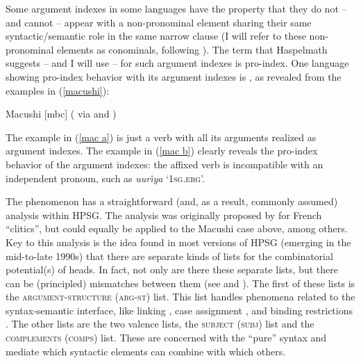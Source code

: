 \documentclass[output=paper
	        ,collection
	        ,collectionchapter
 	        ,biblatex
                ,babelshorthands
                ,newtxmath
                ,draftmode
                ,colorlinks, citecolor=brown
]{langscibook}
\begin{document}
Some argument indexes in some languages have the property that they do not -- and cannot -- appear with a non-pronominal element sharing their same syntactic/semantic role in the same narrow clause (I will refer to these non-pronominal elements as conominals, following \citealt{haspelmath13}). The term that Haspelmath suggests -- and I will use -- for such argument indexes is pro-index. One language showing pro-index behavior with its argument indexes is , as revealed from the examples in (\ref{macushi}): 
%
\begin{samepage}
\begin{exe}
\ex \label{macushi} Macushi [mbc] (\citealt{abbott91} via \citealt{siewierska99} and \citealt{corbett03}) \nolistbreak
\begin{xlist}
\end{xlist}
\end{exe}
\end{samepage}
The example in (\ref{mac a}) is just a verb with all its arguments realized as argument indexes. The example in (\ref{mac b}) clearly reveals the pro-index behavior of the argument indexes: the affixed verb is incompatible with an independent pronoun, such as \textit{uur\^{\i}ya} `\textsc{1sg.erg}'. 

The  phenomenon has a straightforward (and, as a result, commonly assumed) analysis within HPSG. The analysis was originally proposed by \citet{MS97a-u} for French ``clitics'', but could equally be applied to the Macushi case above, among others. Key to this analysis is the idea found in most versions of HPSG (emerging in the mid-to-late 1990s) that there are separate kinds of lists for the combinatorial potential(s) of heads. In fact, not only are there these separate lists, but there can be (principled) mismatches between them (see  and ). The first of these lists is the \textsc{argument-structure} (\textsc{arg-st}) list. This list handles phenomena related to the syntax-semantic interface, like linking \citep{Davis2001a-u}, case assignment \citep{Prze99b}, and binding restrictions \citep{mannsag98,wecharka98}. The other lists are the two valence lists, the \textsc{subject} (\textsc{subj}) list and the \textsc{complements} (\textsc{comps}) list. These are concerned with the ``pure'' syntax and mediate which syntactic elements can combine with which others.
\end{document}
